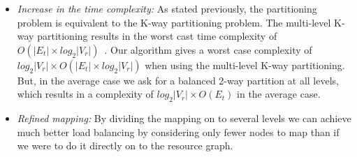 \begin{itemize}

\item \textit{Increase in the time complexity:} As stated previously,
  the partitioning problem is equivalent to the K-way partitioning
  problem. The multi-level K-way partitioning results in the worst cast
  time complexity of $O(|E_t| \times log_2|V_r|)$~\cite{gkar98}. Our
  algorithm gives a worst case complexity of \mbox{$log_2|V_r| \times
    O(|E_t| \times log_2 |V_r|)$} when using the multi-level K-way
  partitioning. But, in the average case we ask for a balanced 2-way
  partition at all levels, which results in a complexity of $log_2 |V_r|
  \times O (E_t)$ in the average case.

\item \textit{Refined mapping:} By dividing the mapping on to several
  levels we can achieve much better load balancing by considering only
  fewer nodes to map than if we were to do it directly on to the
  resource graph. %

\end{itemize}


